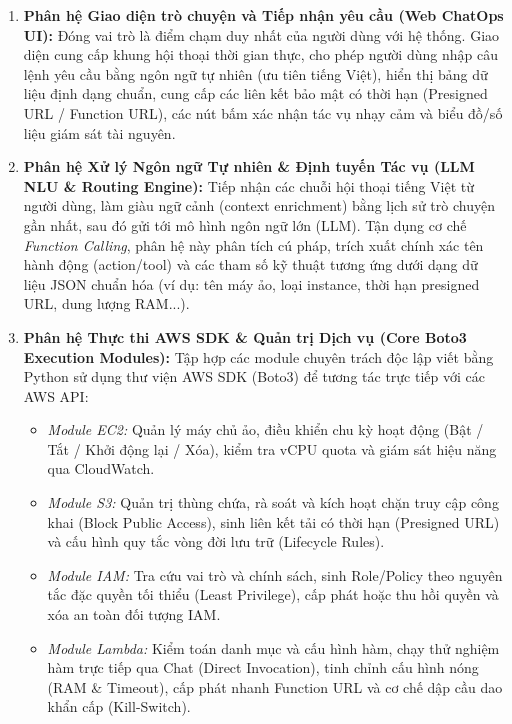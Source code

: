 \documentclass[a4paper,12pt]{article}
\begin{document}
\begin{enumerate}
  \item \textbf{Phân hệ Giao diện trò chuyện và Tiếp nhận yêu cầu (Web ChatOps UI):}
  Đóng vai trò là điểm chạm duy nhất của người dùng với hệ thống. Giao diện cung cấp khung hội thoại thời gian thực, cho phép người dùng nhập câu lệnh yêu cầu bằng ngôn ngữ tự nhiên (ưu tiên tiếng Việt), hiển thị bảng dữ liệu định dạng chuẩn, cung cấp các liên kết bảo mật có thời hạn (Presigned URL / Function URL), các nút bấm xác nhận tác vụ nhạy cảm và biểu đồ/số liệu giám sát tài nguyên.

  \item \textbf{Phân hệ Xử lý Ngôn ngữ Tự nhiên \& Định tuyến Tác vụ (LLM NLU \& Routing Engine):}
  Tiếp nhận các chuỗi hội thoại tiếng Việt từ người dùng, làm giàu ngữ cảnh (context enrichment) bằng lịch sử trò chuyện gần nhất, sau đó gửi tới mô hình ngôn ngữ lớn (LLM). Tận dụng cơ chế \textit{Function Calling}, phân hệ này phân tích cú pháp, trích xuất chính xác tên hành động (action/tool) và các tham số kỹ thuật tương ứng dưới dạng dữ liệu JSON chuẩn hóa (ví dụ: tên máy ảo, loại instance, thời hạn presigned URL, dung lượng RAM...).

  \item \textbf{Phân hệ Thực thi AWS SDK \& Quản trị Dịch vụ (Core Boto3 Execution Modules):}
  Tập hợp các module chuyên trách độc lập viết bằng Python sử dụng thư viện AWS SDK (Boto3) để tương tác trực tiếp với các AWS API:
  \begin{itemize}
    \item \textit{Module EC2:} Quản lý máy chủ ảo, điều khiển chu kỳ hoạt động (Bật / Tắt / Khởi động lại / Xóa), kiểm tra vCPU quota và giám sát hiệu năng qua CloudWatch.
    \item \textit{Module S3:} Quản trị thùng chứa, rà soát và kích hoạt chặn truy cập công khai (Block Public Access), sinh liên kết tải có thời hạn (Presigned URL) và cấu hình quy tắc vòng đời lưu trữ (Lifecycle Rules).
    \item \textit{Module IAM:} Tra cứu vai trò và chính sách, sinh Role/Policy theo nguyên tắc đặc quyền tối thiểu (Least Privilege), cấp phát hoặc thu hồi quyền và xóa an toàn đối tượng IAM.
    \item \textit{Module Lambda:} Kiểm toán danh mục và cấu hình hàm, chạy thử nghiệm hàm trực tiếp qua Chat (Direct Invocation), tinh chỉnh cấu hình nóng (RAM \& Timeout), cấp phát nhanh Function URL và cơ chế dập cầu dao khẩn cấp (Kill-Switch).
  \end{itemize}


\end{enumerate}
\end{document}

